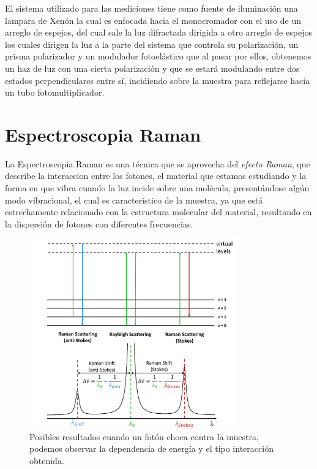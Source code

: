 El sistema utilizado para las mediciones tiene como fuente de iluminación una lampara de Xenón la cual es enfocada hacia el monocromador con el uso de un arreglo de espejos, del cual sale la luz difractada dirigida a otro arreglo de espejos los cuales dirigen la luz a la parte del sistema que controla su polarización, un prisma polarizador y un modulador fotoelástico que al pasar por ellos, obtenemos un haz de luz con una cierta polarización y que se estará modulando entre dos estados perpendiculares entre sí, incidiendo sobre la muestra para reflejarse hacia un tubo fotomultiplicador\cite{LastrasMartnez1993}.

\section{Espectroscopia Raman}
\label{sec:chap3-raman}
La Espectroscopia Raman es una técnica que se aprovecha del \textit{efecto Raman}, que describe la interaccion entre los fotones, el material que estamos estudiando y la forma en que vibra cuando la luz incide sobre una molécula, presentándose algún modo vibracional, el cual es característico de la muestra, ya que está estrechamente relacionado con la estructura molecular del material, resultando en la dispersión de fotones con diferentes frecuencias\cite{Prasankumar2016}.

\begin{figure}[h!]
    \centering
    \includegraphics[width=0.8\textwidth]{figures/chap3/raman-ray-stokes-antistokes.png}
        \caption{Posibles resultados cuando un fotón choca contra la muestra, podemos observar la dependencia de energía y el tipo interacción obtenida.}
    \label{fig:raman_diagram}
\end{figure}


